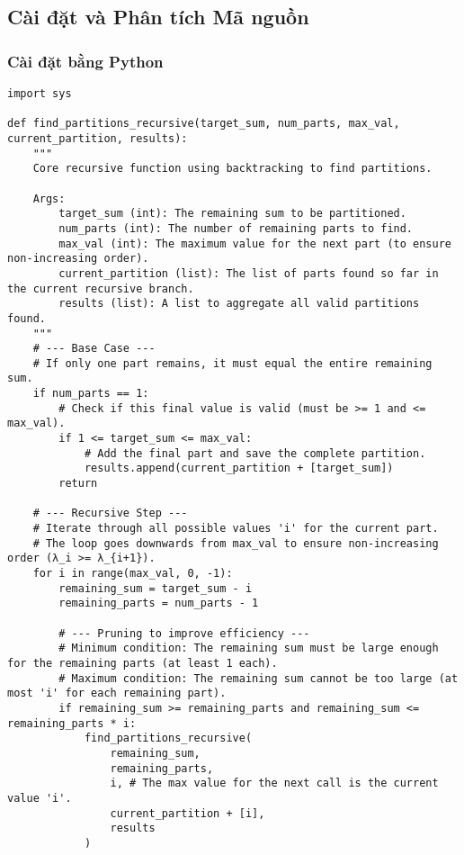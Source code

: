 \documentclass[a4paper,12pt]{article}
\begin{document}
\subsection{Cài đặt và Phân tích Mã nguồn}
\subsubsection{Cài đặt bằng Python}
\begin{lstlisting}[style=pythonstyle, caption={Partition enumeration and Ferrers diagrams in Python.}, label={lst:python_partition_eng}]
import sys

def find_partitions_recursive(target_sum, num_parts, max_val, current_partition, results):
    """
    Core recursive function using backtracking to find partitions.

    Args:
        target_sum (int): The remaining sum to be partitioned.
        num_parts (int): The number of remaining parts to find.
        max_val (int): The maximum value for the next part (to ensure non-increasing order).
        current_partition (list): The list of parts found so far in the current recursive branch.
        results (list): A list to aggregate all valid partitions found.
    """
    # --- Base Case ---
    # If only one part remains, it must equal the entire remaining sum.
    if num_parts == 1:
        # Check if this final value is valid (must be >= 1 and <= max_val).
        if 1 <= target_sum <= max_val:
            # Add the final part and save the complete partition.
            results.append(current_partition + [target_sum])
        return

    # --- Recursive Step ---
    # Iterate through all possible values 'i' for the current part.
    # The loop goes downwards from max_val to ensure non-increasing order (λ_i >= λ_{i+1}).
    for i in range(max_val, 0, -1):
        remaining_sum = target_sum - i
        remaining_parts = num_parts - 1
        
        # --- Pruning to improve efficiency ---
        # Minimum condition: The remaining sum must be large enough for the remaining parts (at least 1 each).
        # Maximum condition: The remaining sum cannot be too large (at most 'i' for each remaining part).
        if remaining_sum >= remaining_parts and remaining_sum <= remaining_parts * i:
            find_partitions_recursive(
                remaining_sum, 
                remaining_parts, 
                i, # The max value for the next call is the current value 'i'.
                current_partition + [i], 
                results
            )


\end{lstlisting}
\end{document}
